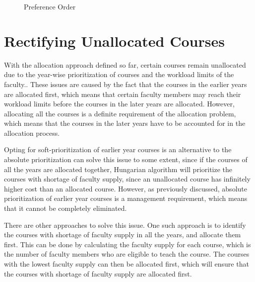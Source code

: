 \begin{figure}[H]
  \centering
  \caption{Preference Order}
  \label{fig:pref_order}
\end{figure}



\section{Rectifying Unallocated Courses}

With the allocation approach defined so far, certain courses remain unallocated due to the year-wise prioritization of courses and the workload limits of the faculty.. These issues are caused by the fact that the courses in the earlier years are allocated first, which means that certain faculty members may reach their workload limits before the courses in the later years are allocated. However, allocating all the courses is a definite requirement of the allocation problem, which means that the courses in the later years have to be accounted for in the allocation process.

Opting for soft-prioritization of earlier year courses is an alternative to the absolute prioritization can solve this issue to some extent, since if the courses of all the years are allocated together, Hungarian algorithm will prioritize the courses with shortage of faculty supply, since an unallocated course has infinitely higher cost than an allocated course. However, as previously discussed, absolute prioritization of earlier year courses is a management requirement, which means that it cannot be completely eliminated.

There are other approaches to solve this issue. One such approach is to identify the courses with shortage of faculty supply in all the years, and allocate them first. This can be done by calculating the faculty supply for each course, which is the number of faculty members who are eligible to teach the course. The courses with the lowest faculty supply can then be allocated first, which will ensure that the courses with shortage of faculty supply are allocated first.

